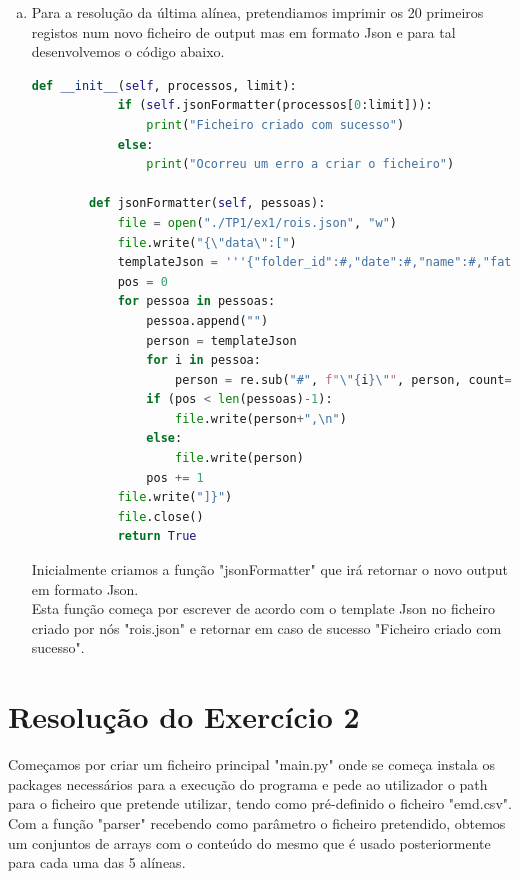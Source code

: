 \documentclass[11pt,a4paper]{report}%
\begin{document}
\begin{enumerate}[a)]
	
	\newpage
	
	
	\item Para a resolução da última alínea, pretendiamos imprimir os 20 primeiros registos num novo ficheiro de output mas em formato Json e para tal desenvolvemos o código abaixo.\\
	
	\begin{lstlisting}[language=python]
		def __init__(self, processos, limit):
			if (self.jsonFormatter(processos[0:limit])):
				print("Ficheiro criado com sucesso")
			else:
				print("Ocorreu um erro a criar o ficheiro")
		
		def jsonFormatter(self, pessoas):
			file = open("./TP1/ex1/rois.json", "w")
			file.write("{\"data\":[")
			templateJson = '''{"folder_id":#,"date":#,"name":#,"father":#,"mother":#,"obs":#}'''
			pos = 0
			for pessoa in pessoas:
				pessoa.append("")
				person = templateJson
				for i in pessoa:
					person = re.sub("#", f"\"{i}\"", person, count=1)
				if (pos < len(pessoas)-1):
					file.write(person+",\n")
				else:
					file.write(person)
				pos += 1
			file.write("]}")
			file.close()
			return True   
	\end{lstlisting}
	Inicialmente criamos a função "jsonFormatter" que irá retornar o novo output em formato Json.\\
	Esta função começa por escrever de acordo com o template Json no ficheiro criado por nós "rois.json" e retornar em caso de sucesso "Ficheiro criado com sucesso".

\end{enumerate}


\newpage


\chapter{Resolução do Exercício 2}

Começamos por criar um ficheiro principal "main.py" onde se começa instala os packages necessários para a execução do programa e pede ao utilizador o path para o ficheiro que pretende utilizar, tendo como pré-definido o ficheiro "emd.csv".
Com a função "parser" recebendo como parâmetro o ficheiro pretendido, obtemos um conjuntos de arrays com o conteúdo do mesmo que é usado posteriormente para cada uma das 5 alíneas.
\end{document}
